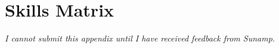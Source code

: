 \chapter{Skills Matrix} %

\label{App:matrix} %


\emph{I cannot submit this appendix until I have received feedback from Sunamp.}


